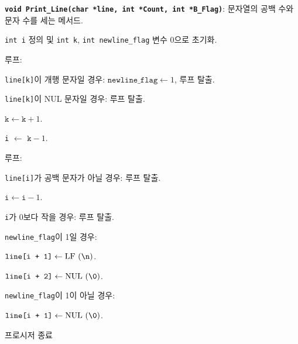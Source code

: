 \textbf{\texttt{void Print_Line(char *line, int *Count, int *B_Flag)}}: 문자열의 공백 수와 문자 수를 세는 메서드.
\begin{algorithm}
	\item \texttt{int i} 정의 및 \texttt{int k}, \texttt{int newline_flag} 변수 0으로 초기화.	
	\item 루프:
			\begin{algorithm}
				\item \texttt{line[k]}이 개행 문자일 경우: $\texttt{newline_flag} \leftarrow 1$, 루프 탈출.
				\item \texttt{line[k]}이 NUL 문자일 경우: 루프 탈출.
				\item $\texttt{k} \leftarrow \texttt{k} + 1$.
			\end{algorithm} 
	\item \texttt{i} $\leftarrow$ $\texttt{k} - 1$.
	\item 루프:
			\begin{algorithm}
				\item \texttt{line[i]}가 공백 문자가 아닐 경우: 루프 탈출.
				\item $\texttt{i} \leftarrow \texttt{i} - 1$.
				\item \texttt{i}가 0보다 작을 경우: 루프 탈출.
			\end{algorithm}
	\item \texttt{newline_flag}이 1일 경우:
			\begin{algorithm}
				\item $\texttt{line[i + 1]} \leftarrow \textrm{LF (\texttt{\textbackslash{}n})}$.
				\item $\texttt{line[i + 2]} \leftarrow \textrm{NUL (\texttt{\textbackslash{}0})}$.
			\end{algorithm}
	\item \texttt{newline_flag}이 1이 아닐 경우:
			\begin{algorithm}
				\item $\texttt{line[i + 1]} \leftarrow \textrm{NUL (\texttt{\textbackslash{}0})}$.
			\end{algorithm}
	\item 프로시저 종료
\end{algorithm}

